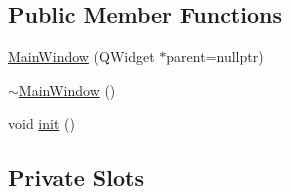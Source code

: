\subsection*{Public Member Functions}
\begin{DoxyCompactItemize}
\item 
\mbox{\hyperlink{classMainWindow_a996c5a2b6f77944776856f08ec30858d}{Main\+Window}} (Q\+Widget $\ast$parent=nullptr)
\item 
\mbox{\hyperlink{classMainWindow_ae98d00a93bc118200eeef9f9bba1dba7}{$\sim$\+Main\+Window}} ()
\item 
void \mbox{\hyperlink{classMainWindow_a671e7e5b0a3a7a3fb1cf44c5c8377952}{init}} ()
\end{DoxyCompactItemize}
\subsection*{Private Slots}
